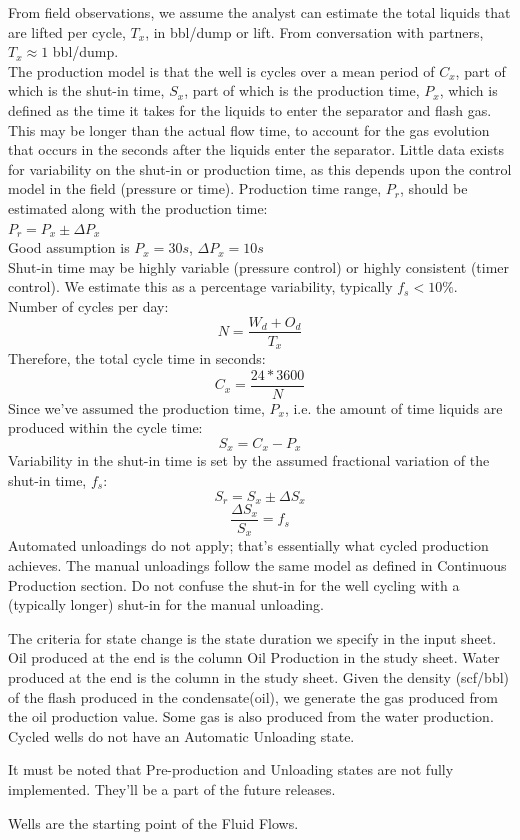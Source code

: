 From field observations, we assume the analyst can estimate the total liquids that are lifted per cycle, $T_x$, in bbl/dump or lift. From conversation with partners, $T_x\approx 1$ bbl/dump.\\
The production model is that the well is cycles over a mean period of $C_x$, part of which is the shut-in time, $S_x$, part of which is the production time, $P_x$, which is defined as the time it takes for the liquids to enter the separator and flash gas. This may be longer than the actual flow time, to account for the gas evolution that occurs in the seconds after the liquids enter the separator. Little data exists for variability on the shut-in or production time, as this depends upon the control model in the field (pressure or time).  Production time range, $P_r$, should be estimated along with the production time:\\
$P_r=P_x\pm \Delta P_x$\\
Good assumption is $P_x=30s$, $\Delta P_x=10s$\\
Shut-in time may be highly variable (pressure control) or highly consistent (timer control). We estimate this as a percentage variability, typically $f_s<10\% $.\\
Number of cycles per day:
\begin{equation}
	N=\frac{W_d+O_d}{T_x}
\end{equation}
Therefore, the total cycle time in seconds:
\begin{equation}
	C_x=\frac{24*3600}{N}
\end{equation}
Since we’ve assumed the production time, $P_x$, i.e. the amount of time liquids are produced within the cycle time:
\begin{equation}
	S_x=C_x-P_x
\end{equation}
Variability in the shut-in time is set by the assumed fractional variation of the shut-in time, $f_s$:
\begin{equation}
	S_r=S_x\pm \Delta S_x
\end{equation}
\begin{equation}
	\frac{\Delta S_x}{S_x}=f_s
\end{equation}
Automated unloadings do not apply; that’s essentially what cycled production achieves.  The manual unloadings follow the same model as defined in Continuous Production section.  Do not confuse the shut-in for the well cycling with a (typically longer) shut-in for the manual unloading. 
\par The criteria for state change is the state duration we specify in the input sheet. Oil produced at the end is the column Oil Production in the study sheet. Water produced at the end is the column in the study sheet. Given the density (scf/bbl) of the flash produced in the condensate(oil), we generate the gas produced from the oil production value. Some gas is also produced from the water production. Cycled wells do not have an Automatic Unloading state.
\par It must be noted that Pre-production and Unloading states are not fully implemented. They'll be a part of the future releases.
\par Wells are the starting point of the Fluid Flows. 

